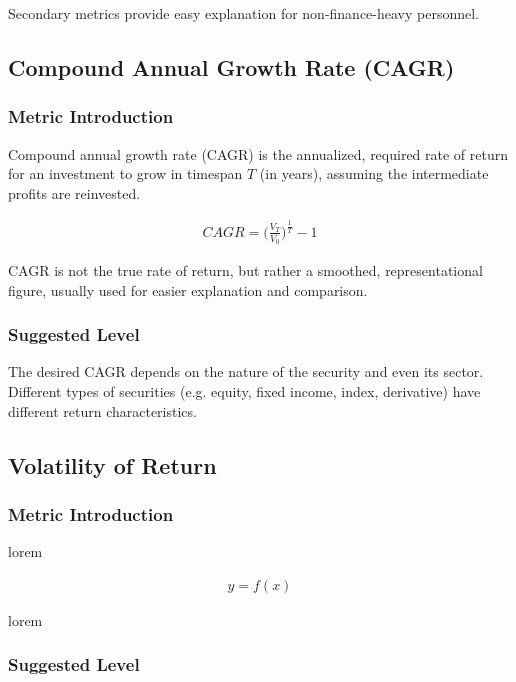 \documentclass[12pt]{article}
\begin{document}
Secondary metrics provide easy explanation for non-finance-heavy personnel.

\subsection{Compound Annual Growth Rate (CAGR)}

\subsubsection*{Metric Introduction}

Compound annual growth rate (CAGR) is the annualized, required rate of return for an investment to grow in timespan \(T\) (in years), assuming the intermediate profits are reinvested.

\begin{align*}
  CAGR = \bigg(\frac{V_T}{V_0} \bigg)^{\frac{1}{T}}-1
\end{align*}

CAGR is not the true rate of return, but rather a smoothed, representational figure, usually used for easier explanation and comparison.

\subsubsection*{Suggested Level}

The desired CAGR depends on the nature of the security and even its sector. Different types of securities (e.g. equity, fixed income, index, derivative) have different return characteristics.

\subsection{Volatility of Return}

\subsubsection*{Metric Introduction}

lorem

\begin{align*}
  y = f(x)
\end{align*}

lorem

\subsubsection*{Suggested Level}
\end{document}
